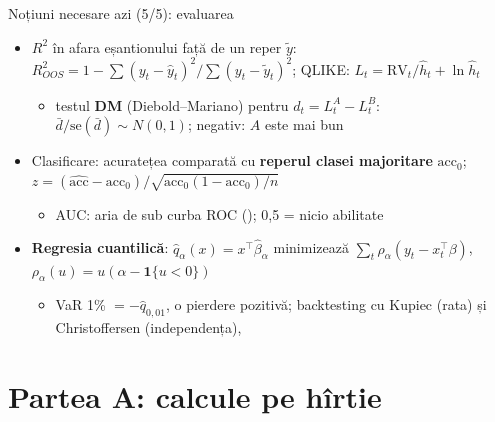 \begin{frame}{Noțiuni necesare azi (5/5): evaluarea}
\itemsize{\footnotesize}
\begin{itemize}
    \item $R^2$ în afara eșantionului față de un reper $\tilde y$: $R^2_{OOS} = 1 - \sum(y_t - \hat y_t)^2/\sum(y_t - \tilde y_t)^2$; QLIKE: $L_t = \mathrm{RV}_t/\hat h_t + \ln\hat h_t$
    \begin{itemize}
        \item testul \textbf{DM} (Diebold--Mariano) pentru $d_t = L_t^A - L_t^B$: $\bar d/\mathrm{se}(\bar d) \sim N(0, 1)$; negativ: $A$ este mai bun
    \end{itemize}
    \item Clasificare: acuratețea comparată cu \textbf{reperul clasei majoritare} $\mathrm{acc}_0$; $z = (\widehat{\mathrm{acc}} - \mathrm{acc}_0)/\sqrt{\mathrm{acc}_0(1 - \mathrm{acc}_0)/n}$
    \begin{itemize}
        \item AUC: aria de sub curba ROC (); 0,5 = nicio abilitate
    \end{itemize}
    \item \textbf{Regresia cuantilică}: $\hat q_\alpha(x) = x^\top\hat\beta_\alpha$ minimizează $\sum_t \rho_\alpha(y_t - x_t^\top\beta)$, $\rho_\alpha(u) = u(\alpha - \mathbf{1}\{u < 0\})$
    \begin{itemize}
        \item VaR 1\% $= -\hat q_{0{,}01}$, o pierdere pozitivă; backtesting cu Kupiec (rata) și Christoffersen (independența), 
    \end{itemize}
\end{itemize}
\end{frame}


\section{Partea A: calcule pe hîrtie}

